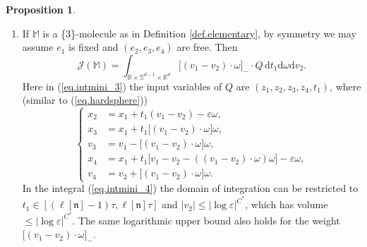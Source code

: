 \documentclass[10pt, reqno]{amsart}
\newcommand{\Mb}{\mathbb M}
\newcommand{\Rb}{\mathbb R}
\newcommand{\Sb}{\mathbb S}
\newcommand{\Tb}{\mathbb T}
\newcommand{\Zb}{\mathbb Z}
\newcommand {\Jc}{\mathcal J}
\newcommand{\nf}{\mathfrak n}
\theoremstyle{definition}
\newtheorem{proposition}[theorem]{Proposition}
\theoremstyle{remark}
\numberwithin{equation}{section}
\begin{document}
\begin{proposition}
\begin{enumerate}
Note that all the values of $t_1$ occurring in the summation in (\ref{eq.intmini_1}) can be indexed by a variable $m\in\Zb^d$ with $|m|\leq|\log\varepsilon|^{C^*}$, which represents different fundamental domains of $\Tb^d$ within $\Rb^d$. The number of choices of $m$ is $\leq|\log\varepsilon|^{C^*}$, and this allows to decompose
\begin{equation}\label{eq.extradecomp}
\Jc(\Mb)=\sum_{|m|\leq |\log\varepsilon|^{C^*}}\Jc_m(\Mb),\qquad 0\leq \Jc_m(\Mb)\leq Q,
\end{equation} where for each $m$, the variables in $Q$ in (\ref{eq.extradecomp}) is defined as above with $t_1$ being the solution to (\ref{eq.intmini_1}) indexed by $m$.
\item\label{it.intmini_2} If $\Mb$ is a \{3\}-molecule as in Definition \ref{def.elementary}, by symmetry we may assume $e_1$ is fixed and $(e_2,e_3,e_4)$ are free. Then
\begin{equation}\label{eq.intmini_3}
\Jc(\Mb)=\int_{\Rb\times\Sb^{d-1}\times\Rb^d}\big[(v_1-v_2)\cdot\omega\big]_-\cdot Q\,\mathrm{d}t_1\mathrm{d}\omega\mathrm{d}v_2.
\end{equation} Here in (\ref{eq.intmini_3}) the input variables of $Q$ are $(z_1,z_2,z_3,z_4,t_1)$, where (similar to (\ref{eq.hardsphere}))
\begin{equation}\label{eq.intmini_4}
\left\{
\begin{aligned}
x_2&=x_1+t_1(v_1-v_2)-\varepsilon\omega,\\
x_3&=x_1+t_1\big[(v_1-v_2)\cdot\omega\big]\omega,\\
v_3&=v_1-\big[(v_1-v_2)\cdot\omega\big]\omega,\\
x_4&=x_1+t_1\big[v_1-v_2-((v_1-v_2)\cdot\omega)\omega\big]-\varepsilon\omega,\\
v_4&=v_2+[(v_1-v_2)\cdot\omega\big]\omega.
\end{aligned}
\right.
\end{equation}
In the integral (\ref{eq.intmini_4}) the domain of integration can be restricted to $t_1\in [(\ell[\nf]-1)\tau,\ell[\nf]\tau]$ and $|v_2|\leq|\log\varepsilon|^{C^*}$, which has volume $\leq|\log\varepsilon|^{C^*}$. The same logarithmic upper bound also holds for the weight $\big[(v_1-v_2)\cdot\omega\big]_-$.


\end{enumerate}
\end{proposition}
\end{document}
